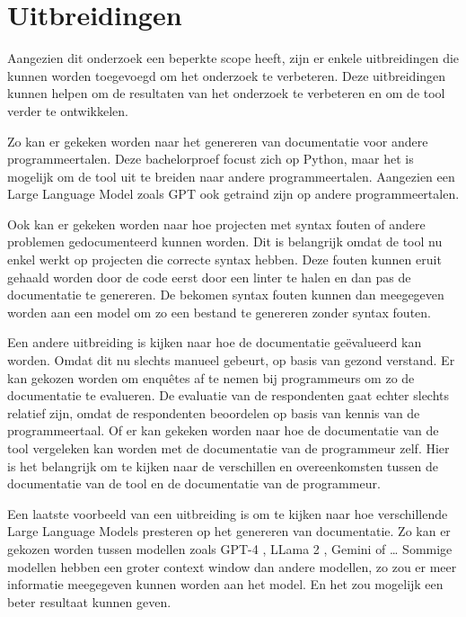 
\chapter{Uitbreidingen}
\label{ch:uitbreidingen}

Aangezien dit onderzoek een beperkte scope heeft, zijn er enkele uitbreidingen die kunnen worden toegevoegd om het onderzoek te verbeteren.
Deze uitbreidingen kunnen helpen om de resultaten van het onderzoek te verbeteren en om de tool verder te ontwikkelen.

Zo kan er gekeken worden naar het genereren van documentatie voor andere programmeertalen.
Deze bachelorproef focust zich op Python, maar het is mogelijk om de tool uit te breiden naar andere programmeertalen.
Aangezien een Large Language Model zoals GPT \autocite{OpenAi} ook getraind zijn op andere programmeertalen.

Ook kan er gekeken worden naar hoe projecten met syntax fouten of andere problemen gedocumenteerd kunnen worden.
Dit is belangrijk omdat de tool nu enkel werkt op projecten die correcte syntax hebben.
Deze fouten kunnen eruit gehaald worden door de code eerst door een linter te halen en dan pas de documentatie te genereren.
De bekomen syntax fouten kunnen dan meegegeven worden aan een model om zo een bestand te genereren zonder syntax fouten.

Een andere uitbreiding is kijken naar hoe de documentatie geëvalueerd kan worden.
Omdat dit nu slechts manueel gebeurt, op basis van gezond verstand. 
Er kan gekozen worden om enquêtes af te nemen bij programmeurs om zo de documentatie te evalueren.
De evaluatie van de respondenten gaat echter slechts relatief zijn, omdat de respondenten beoordelen op basis van kennis van de programmeertaal. 
Of er kan gekeken worden naar hoe de documentatie van de tool vergeleken kan worden met de documentatie van de programmeur zelf.
Hier is het belangrijk om te kijken naar de verschillen en overeenkomsten tussen de documentatie van de tool en de documentatie van de programmeur.

Een laatste voorbeeld van een uitbreiding is om te kijken naar hoe verschillende Large Language Models presteren op het genereren van documentatie.
Zo kan er gekozen worden tussen modellen zoals GPT-4 \autocite{OpenAI2023}, LLama 2 \autocite{Meta2024}, Gemini \autocite{Google2024} of \dots
Sommige modellen hebben een groter context window dan andere modellen, zo zou er meer informatie meegegeven kunnen worden aan het model.
En het zou mogelijk een beter resultaat kunnen geven.